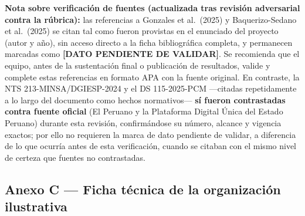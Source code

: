 \documentclass[11pt,a4paper]{article}
\begin{document}
\textbf{Nota sobre verificación de fuentes (actualizada tras revisión adversarial contra la rúbrica):} las referencias a Gonzales et al.~(2025) y Baquerizo-Sedano et al.~(2025) se citan tal como fueron provistas en el enunciado del proyecto (autor y año), sin acceso directo a la ficha bibliográfica completa, y permanecen marcadas como \textbf{{[}DATO PENDIENTE DE VALIDAR{]}}. Se recomienda que el equipo, antes de la sustentación final o publicación de resultados, valide y complete estas referencias en formato APA con la fuente original. En contraste, la NTS 213-MINSA/DGIESP-2024 y el DS 115-2025-PCM ---citadas repetidamente a lo largo del documento como hechos normativos--- \textbf{sí fueron contrastadas contra fuente oficial} (El Peruano y la Plataforma Digital Única del Estado Peruano) durante esta revisión, confirmándose su número, alcance y vigencia exactos; por ello no requieren la marca de dato pendiente de validar, a diferencia de lo que ocurría antes de esta verificación, cuando se citaban con el mismo nivel de certeza que fuentes no contrastadas.

\subsection{Anexo C --- Ficha técnica de la organización ilustrativa}\label{anexo-c-ficha-tuxe9cnica-de-la-organizaciuxf3n-ilustrativa}
\end{document}
